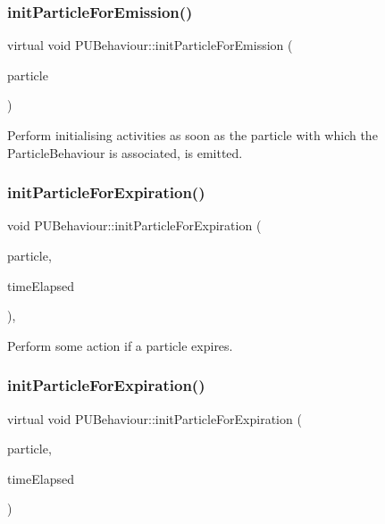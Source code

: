\subsubsection{\texorpdfstring{init\+Particle\+For\+Emission()}{initParticleForEmission()}\hspace{0.1cm}{\footnotesize\ttfamily [2/2]}}
{\footnotesize\ttfamily virtual void P\+U\+Behaviour\+::init\+Particle\+For\+Emission (\begin{DoxyParamCaption}\item[{\hyperlink{structPUParticle3D}{P\+U\+Particle3D} $\ast$}]{particle }\end{DoxyParamCaption})\hspace{0.3cm}{\ttfamily [virtual]}}

Perform initialising activities as soon as the particle with which the Particle\+Behaviour is associated, is emitted. \mbox{\label{classPUBehaviour_a617f6ffd347e4ac810b5afa9aee1fc04}} 
\subsubsection{\texorpdfstring{init\+Particle\+For\+Expiration()}{initParticleForExpiration()}\hspace{0.1cm}{\footnotesize\ttfamily [1/2]}}
{\footnotesize\ttfamily void P\+U\+Behaviour\+::init\+Particle\+For\+Expiration (\begin{DoxyParamCaption}\item[{\hyperlink{structPUParticle3D}{P\+U\+Particle3D} $\ast$}]{particle,  }\item[{float}]{time\+Elapsed }\end{DoxyParamCaption})\hspace{0.3cm}{\ttfamily [inline]}, {\ttfamily [virtual]}}

Perform some action if a particle expires. \mbox{\label{classPUBehaviour_ab77067227834ed42729100f564e34ade}} 
\subsubsection{\texorpdfstring{init\+Particle\+For\+Expiration()}{initParticleForExpiration()}\hspace{0.1cm}{\footnotesize\ttfamily [2/2]}}
{\footnotesize\ttfamily virtual void P\+U\+Behaviour\+::init\+Particle\+For\+Expiration (\begin{DoxyParamCaption}\item[{\hyperlink{structPUParticle3D}{P\+U\+Particle3D} $\ast$}]{particle,  }\item[{float}]{time\+Elapsed }\end{DoxyParamCaption})\hspace{0.3cm}{\ttfamily [virtual]}}

